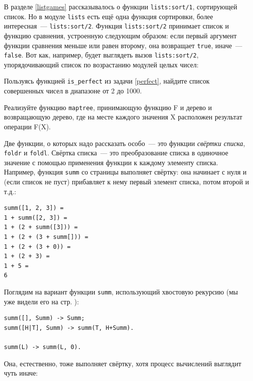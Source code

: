\documentclass[
  paper=a4,
  fontsize=14pt,
  openany,
  appendixprefix=true
]{scrbook}
\begin{document}
В разделе \ref{listgames} рассказывалось о функции \lstinline{lists:sort/1}, сортирующей список. Но в модуле \lstinline{lists} есть ещё одна функция сортировки, более интересная~--- \lstinline{lists:sort/2}. Функция \lstinline{lists:sort/2} принимает список и функцию сравнения, устроенную следующим образом: если первый аргумент функции сравнения меньше или равен второму, она возвращает \lstinline{true}, иначе~--- \lstinline{false}. Вот как, например, будет выглядеть вызов \lstinline{lists:sort/2}, упорядочивающий список по возрастанию модулей целых чисел:


\begin{problem}\label{perfect_list}
Пользуясь функцией \lstinline{is_perfect} из задачи \ref{perfect}, найдите список совершенных чисел в диапазоне от 2 до 1000.
\end{problem}

\begin{problem}\label{maptree}
Реализуйте функцию \lstinline{maptree}, принимающую функцию F и дерево и возвращающую дерево, где на месте каждого значения X расположен результат операции F(X).
\end{problem}

Две функции, о которых надо рассказать особо~--- это функции {\em свёртки списка}, \lstinline{foldr} и \lstinline{foldl}. Свёртка списка~--- это преобразование списка в одиночное значение с помощью применения функции к каждому элементу списка. Например, функция \lstinline{summ} со страницы \pageref{listsumm} выполняет свёртку: она начинает с нуля и (если список не пуст) прибавляет к нему первый элемент списка, потом второй и т.д.:
\begin{verbatim}
summ([1, 2, 3]) =
1 + summ([2, 3]) =
1 + (2 + summ([3])) =
1 + (2 + (3 + summ[])) =
1 + (2 + (3 + 0)) =
1 + (2 + 3) =
1 + 5 =
6
\end{verbatim}

Поглядим на вариант функции \lstinline{summ}, использующий хвостовую рекурсию (мы уже видели его на стр. \pageref{tailsumm}):
\begin{lstlisting}
summ([], Summ) -> Summ;
summ([H|T], Summ) -> summ(T, H+Summ).

summ(L) -> summ(L, 0).
\end{lstlisting}

Она, естественно, тоже выполняет свёртку, хотя процесс вычислений выглядит чуть иначе:
\end{document}
